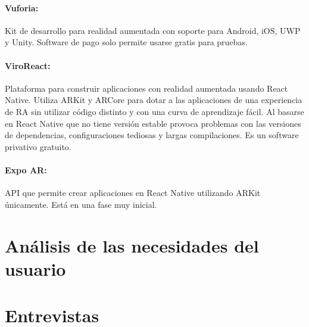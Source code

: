\paragraph{Vuforia:}
Kit de desarrollo para realidad aumentada con soporte para Android, iOS, UWP y Unity.
Software de pago solo permite usarse gratis para pruebas.

\paragraph{ViroReact:}
Plataforma para construir aplicaciones con realidad aumentada usando React Native.
 Utiliza ARKit y ARCore para dotar a las aplicaciones de una experiencia de RA sin
 utilizar código distinto y con una curva de aprendizaje fácil. Al basarse en React
 Native que no tiene versión estable provoca problemas con las versiones de dependencias,
 configuraciones tediosas y largas compilaciones.
Es un software privativo gratuito.

\paragraph{Expo AR:}
API que permite crear aplicaciones en React Native utilizando ARKit únicamente.
Está en una fase muy inicial.




\section{Análisis de las necesidades del usuario}
\label{makereference2.2}

\section{Entrevistas}
\label{makereference2.3}


